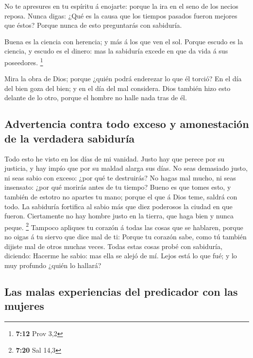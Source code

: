  No te apresures en tu espíritu á enojarte: porque la ira
en el seno de los necios reposa.  Nunca digas: ¿Qué es la
causa que los tiempos pasados fueron mejores que éstos? Porque nunca de
esto preguntarás con sabiduría.

 Buena es la ciencia con herencia; y más á los que ven el
sol.  Porque escudo es la ciencia, y escudo es el dinero:
mas la sabiduría excede en que da vida á sus poseedores. \footnote{\textbf{7:12}
  Prov 3,2}

 Mira la obra de Dios; porque ¿quién podrá enderezar lo
que él torció?  En el día del bien goza del bien; y en el
día del mal considera. Dios también hizo esto delante de lo otro, porque
el hombre no halle nada tras de él.

\hypertarget{advertencia-contra-todo-exceso-y-amonestaciuxf3n-de-la-verdadera-sabiduruxeda}{%
\subsection{Advertencia contra todo exceso y amonestación de la
verdadera
sabiduría}\label{advertencia-contra-todo-exceso-y-amonestaciuxf3n-de-la-verdadera-sabiduruxeda}}

 Todo esto he visto en los días de mi vanidad. Justo hay
que perece por su justicia, y hay impío que por su maldad alarga sus
días.  No seas demasiado justo, ni seas sabio con exceso:
¿por qué te destruirás?  No hagas mal mucho, ni seas
insensato: ¿por qué morirás antes de tu tiempo?  Bueno es
que tomes esto, y también de estotro no apartes tu mano; porque el que á
Dios teme, saldrá con todo.  La sabiduría fortifica al
sabio más que diez poderosos la ciudad en que fueron. 
Ciertamente no hay hombre justo en la tierra, que haga bien y nunca
peque. \footnote{\textbf{7:20} Sal 14,3}  Tampoco
apliques tu corazón á todas las cosas que se hablaren, porque no oigas á
tu siervo que dice mal de ti:  Porque tu corazón sabe,
como tú también dijiste mal de otros muchas veces.  Todas
estas cosas probé con sabiduría, diciendo: Hacerme he sabio: mas ella se
alejó de mí.  Lejos está lo que fué; y lo muy profundo
¿quién lo hallará?

\hypertarget{las-malas-experiencias-del-predicador-con-las-mujeres}{%
\subsection{Las malas experiencias del predicador con las
mujeres}\label{las-malas-experiencias-del-predicador-con-las-mujeres}}

